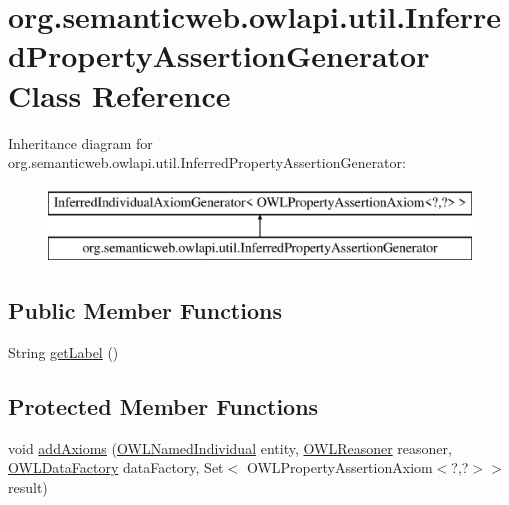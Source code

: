 \hypertarget{classorg_1_1semanticweb_1_1owlapi_1_1util_1_1_inferred_property_assertion_generator}{\section{org.\-semanticweb.\-owlapi.\-util.\-Inferred\-Property\-Assertion\-Generator Class Reference}
\label{classorg_1_1semanticweb_1_1owlapi_1_1util_1_1_inferred_property_assertion_generator}
}
Inheritance diagram for org.\-semanticweb.\-owlapi.\-util.\-Inferred\-Property\-Assertion\-Generator\-:\begin{figure}[H]
\begin{center}
\leavevmode
\includegraphics[height=2.000000cm]{classorg_1_1semanticweb_1_1owlapi_1_1util_1_1_inferred_property_assertion_generator}
\end{center}
\end{figure}
\subsection*{Public Member Functions}
\begin{DoxyCompactItemize}
\item 
String \hyperlink{classorg_1_1semanticweb_1_1owlapi_1_1util_1_1_inferred_property_assertion_generator_a4960f4c2cb93cadc15485677a6ef47cc}{get\-Label} ()
\end{DoxyCompactItemize}
\subsection*{Protected Member Functions}
\begin{DoxyCompactItemize}
\item 
void \hyperlink{classorg_1_1semanticweb_1_1owlapi_1_1util_1_1_inferred_property_assertion_generator_a7de7f6c79c663699470a87ffe7e89f88}{add\-Axioms} (\hyperlink{interfaceorg_1_1semanticweb_1_1owlapi_1_1model_1_1_o_w_l_named_individual}{O\-W\-L\-Named\-Individual} entity, \hyperlink{interfaceorg_1_1semanticweb_1_1owlapi_1_1reasoner_1_1_o_w_l_reasoner}{O\-W\-L\-Reasoner} reasoner, \hyperlink{interfaceorg_1_1semanticweb_1_1owlapi_1_1model_1_1_o_w_l_data_factory}{O\-W\-L\-Data\-Factory} data\-Factory, Set$<$ O\-W\-L\-Property\-Assertion\-Axiom$<$?,?$>$$>$ result)
\end{DoxyCompactItemize}


